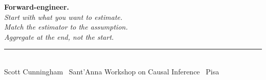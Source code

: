 \documentclass[aspectratio=169,11pt]{beamer}
\begin{document}
\begin{frame}[plain]
\centering
\vspace{2.5em}
{\Huge\bfseries\color{forest} Forward-engineer.}\\[1.5em]
{\Large\itshape\color{charcoal} Start with what you want to estimate.\\Match the estimator to the assumption.\\Aggregate at the end, not the start.}\\[2em]
\rule{0.4\textwidth}{0.6pt}\\[0.8em]
{\small\color{warmgray} Scott Cunningham \textperiodcentered\ Sant'Anna Workshop on Causal Inference \textperiodcentered\ Pisa}
\end{frame}
\end{document}
